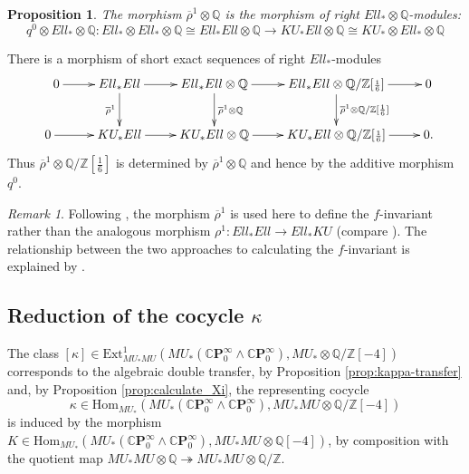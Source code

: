 \documentclass[10pt,a4paper]{amsart}
\newtheorem{prop}[thm]{Proposition}
\theoremstyle{definition}
\theoremstyle{remark}
\newtheorem{rem}[thm]{Remark}
\newcommand{\rhobar}{\overline{\rho}}
\newcommand{\qz}{{\rat/\zed}}
\newcommand{\qzsix}{{\rat/\zed[{\scriptstyle{\frac{1}{6}}}]}}
\renewcommand{\hom}{\mathrm{Hom}}
\newcommand{\ext}{\mathrm{Ext}}
\newcommand{\zed}{\mathbb{Z}}
\newcommand{\rat}{\mathbb{Q}}
\newcommand{\tmfcoeff}{{Ell}}
\newcommand{\cp}{\mathbb{C} \mathbf{P}^\infty}
\renewcommand{\smash}{\wedge}
\begin{document}
\begin{prop}
\label{prop:rho_rat}
The morphism $\rhobar^1 \otimes \rat$ is the morphism of right $\tmfcoeff_* \otimes \rat$-modules:
\[
q^0 \otimes \tmfcoeff_*  \otimes \rat :
\tmfcoeff_* \otimes \tmfcoeff_* \otimes \rat
\cong
\tmfcoeff_* \tmfcoeff \otimes \rat
\rightarrow
 KU_* \tmfcoeff\otimes \rat
 \cong
KU_* \otimes  \tmfcoeff_* \otimes \rat
\]
\end{prop}






There is a morphism of short exact sequences of right  $\tmfcoeff_*$-modules
\begin{eqnarray}
\label{eqn:ses-rho1}
	\xymatrix{
\ \ \ \ 0
\ar[r]
&
\tmfcoeff_*\tmfcoeff
\ar[r]
\ar[d]_{\rhobar^1}
&
\tmfcoeff_*\tmfcoeff \otimes \rat
\ar[r]
\ar[d]^{\rhobar^1 \otimes \rat}
&
\tmfcoeff_*\tmfcoeff \otimes \qzsix
\ar[r]
\ar[d]^{\rhobar^1 \otimes \qzsix}
&
0
\\
0
\ar[r]
&
KU_* \tmfcoeff
\ar[r]
&
KU_* \tmfcoeff\otimes \rat
\ar[r]
&
KU_* \tmfcoeff \otimes \qzsix
\ar[r]
&
0.
}
\end{eqnarray}
Thus  $\rhobar^1 \otimes \qzsix$ is determined by $\rhobar^1 \otimes \rat$ and
hence by the additive morphism $q^0$.

\begin{rem}
	Following \cite[Theorem 4.2]{behrens_laures}, the morphism $\rhobar^1$ is used here to define the $f$-invariant rather than the analogous morphism
	$\rho^1 : \tmfcoeff_*\tmfcoeff \rightarrow \tmfcoeff_* KU$ (compare  \cite[Proposition 3.9]{laures}). The relationship between the two approaches to calculating the $f$-invariant is explained by \cite[Proposition 3.10]{laures}.
\end{rem}




\subsection{Reduction of the cocycle  $\kappa$}
\label{subsect:basechange_kappa_ell}

The class $[\kappa] \in \ext^1 _{MU_*MU} (MU_* (\cp_0 \smash \cp_0), MU_* \otimes \qz[-4])$ corresponds to the algebraic double transfer, by Proposition \ref{prop:kappa-transfer} and, by  Proposition \ref{prop:calculate_Xi}, the representing  cocycle
\[
\kappa \in \hom_{MU_*} (MU_* (\cp_0 \smash \cp_0) , MU_*MU \otimes \qz[-4])
\]
 is induced by the morphism $K \in \hom_{MU_*} (MU_*
(\cp_0 \smash
\cp_0) , MU_*MU \otimes \rat [-4])$, by composition with the quotient map $MU_*MU
\otimes \rat \twoheadrightarrow MU_*MU \otimes \qz$.
\end{document}
